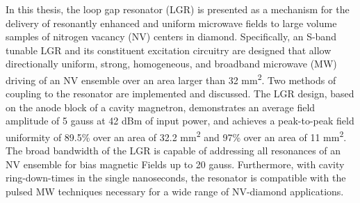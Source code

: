 % 
% 
%


In this thesis, the loop gap resonator (LGR) is presented as a mechanism for the delivery of resonantly enhanced and uniform microwave fields to large volume samples of nitrogen vacancy (NV) centers in diamond. Specifically, an S-band tunable LGR and its constituent excitation circuitry are designed that allow directionally uniform, strong, homogeneous, and broadband
microwave (MW) driving of an NV ensemble over an area larger than 32 mm\textsuperscript{2}. Two methods of coupling to the resonator are implemented and discussed. The LGR design, based on the anode
block of a cavity magnetron, demonstrates an average field amplitude of 5 gauss at 42 dBm of input power, and achieves a peak-to-peak
field uniformity of 89.5\% over an area of 32.2 mm\textsuperscript{2} and 97\% over an area of 11 mm\textsuperscript{2}. The broad bandwidth of the LGR is capable of addressing all resonances of an NV ensemble for bias magnetic Fields up to 20 gauss. Furthermore, with cavity
ring-down-times in the single nanoseconds, the resonator is compatible with the pulsed MW techniques necessary for a wide range of NV-diamond
applications.

